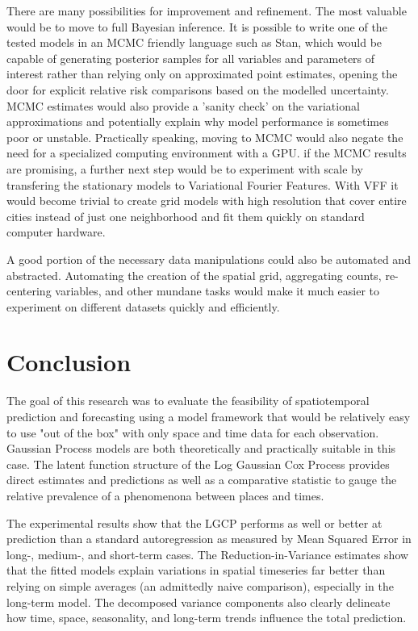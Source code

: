 There are many possibilities for improvement and refinement. The most valuable would be to move to full Bayesian inference. It is possible to write one of the tested models in an MCMC friendly language such as Stan, which would be capable of generating posterior samples for all variables and parameters of interest rather than relying only on approximated point estimates, opening the door for explicit relative risk comparisons based on the modelled uncertainty. MCMC estimates would also provide a 'sanity check' on the variational approximations and potentially explain why model performance is sometimes poor or unstable. Practically speaking, moving to MCMC would also negate the need for a specialized computing environment with a GPU. if the MCMC results are promising, a further next step would be to experiment with scale by transfering the stationary models to Variational Fourier Features. With VFF it would become trivial to create grid models with high resolution that cover entire cities instead of just one neighborhood and fit them quickly on standard computer hardware.  \par


A good portion of the necessary data manipulations could also be automated and abstracted. Automating the creation of the spatial grid, aggregating counts, re-centering variables, and other mundane tasks would make it much easier to experiment on different datasets quickly and efficiently.


\section{Conclusion}

The goal of this research was to evaluate the feasibility of spatiotemporal prediction and forecasting using a model framework that would be relatively easy to use "out of the box" with only space and time data for each observation. Gaussian Process models are both theoretically and practically suitable in this case. The latent function structure of the Log Gaussian Cox Process provides direct estimates and predictions as well as a comparative statistic to gauge the relative prevalence of a phenomenona between places and times. \par

The experimental results show that the LGCP performs as well or better at prediction than a standard autoregression as measured by Mean Squared Error in long-, medium-, and short-term cases. The Reduction-in-Variance estimates show that the fitted models explain variations in spatial timeseries far better than relying on simple averages (an admittedly naive comparison), especially in the long-term model. The decomposed variance components also clearly delineate how time, space, seasonality, and long-term trends influence the total prediction. \par

